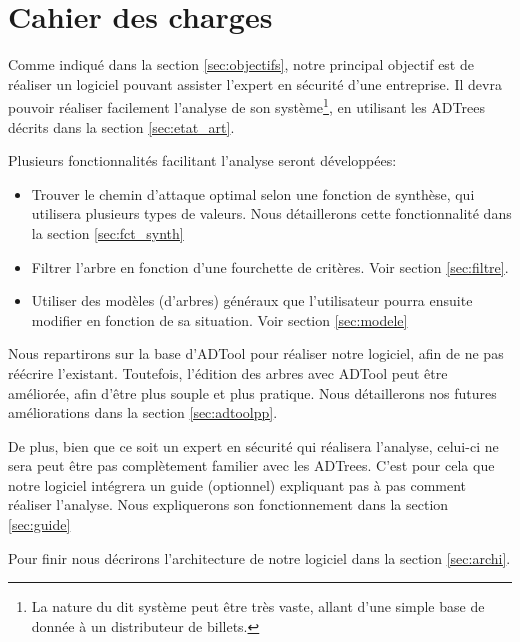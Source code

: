 \section{Cahier des charges}
    \label{sec:cahier}


    Comme indiqué dans la section \ref{sec:objectifs}, notre principal objectif est de réaliser un logiciel pouvant assister l'expert en sécurité d'une entreprise. Il devra pouvoir réaliser facilement l'analyse de son système\footnote{La nature du dit système peut être très vaste, allant d'une simple base de donnée à un distributeur de billets.}, en utilisant les ADTrees décrits dans la section \ref{sec:etat_art}.

    Plusieurs fonctionnalités facilitant l'analyse seront développées:
    \begin{itemize}
        \item Trouver le chemin d'attaque optimal selon une fonction de synthèse, qui utilisera plusieurs types de valeurs. Nous détaillerons cette fonctionnalité dans la section \ref{sec:fct_synth}
        \item Filtrer l'arbre en fonction d'une fourchette de critères. Voir section \ref{sec:filtre}.
        \item Utiliser des modèles (d'arbres) généraux que l'utilisateur pourra ensuite modifier en fonction de sa situation. Voir section \ref{sec:modele}
    \end{itemize}

    Nous repartirons sur la base d'ADTool pour réaliser notre logiciel, afin de ne pas réécrire l'existant. Toutefois, l'édition des arbres avec ADTool peut être améliorée, afin d'être plus souple et plus pratique. Nous détaillerons nos futures améliorations dans la section \ref{sec:adtoolpp}.

    De plus, bien que ce soit un expert en sécurité qui réalisera l'analyse, celui-ci ne sera peut être pas complètement familier avec les ADTrees. C'est pour cela que notre logiciel intégrera un guide (optionnel) expliquant pas à pas comment réaliser l'analyse. Nous expliquerons son fonctionnement dans la section \ref{sec:guide}

    Pour finir nous décrirons l'architecture de notre logiciel dans la section \ref{sec:archi}.


